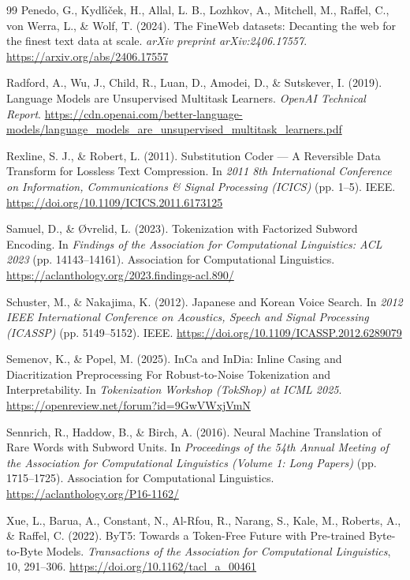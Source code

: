 \documentclass{article}
\begin{document}
\begin{thebibliography}{99}
Penedo, G., Kydl{\'\i}{\v{c}}ek, H., Allal, L. B., Lozhkov, A., Mitchell, M., Raffel, C., von Werra, L., \& Wolf, T. (2024). The FineWeb datasets: Decanting the web for the finest text data at scale. \emph{arXiv preprint arXiv:2406.17557}. \url{https://arxiv.org/abs/2406.17557}

Radford, A., Wu, J., Child, R., Luan, D., Amodei, D., \& Sutskever, I. (2019). Language Models are Unsupervised Multitask Learners. \emph{OpenAI Technical Report}. \url{https://cdn.openai.com/better-language-models/language_models_are_unsupervised_multitask_learners.pdf}

Rexline, S. J., \& Robert, L. (2011). Substitution Coder --- A Reversible
Data Transform for Lossless Text Compression. In \emph{2011 8th
International Conference on Information, Communications \& Signal
Processing (ICICS)} (pp. 1--5). IEEE.
\url{https://doi.org/10.1109/ICICS.2011.6173125}

Samuel, D., \& {\O}vrelid, L. (2023). Tokenization with Factorized Subword
Encoding. In \emph{Findings of the Association for Computational
Linguistics: ACL 2023} (pp. 14143--14161). Association for Computational
Linguistics. \url{https://aclanthology.org/2023.findings-acl.890/}

Schuster, M., \& Nakajima, K. (2012). Japanese and Korean Voice Search. In \emph{2012 IEEE International Conference on Acoustics, Speech and Signal Processing (ICASSP)} (pp. 5149--5152). IEEE. \url{https://doi.org/10.1109/ICASSP.2012.6289079}

Semenov, K., \& Popel, M. (2025). InCa and InDia: Inline Casing and Diacritization Preprocessing For Robust-to-Noise Tokenization and Interpretability. In \emph{Tokenization Workshop (TokShop) at ICML 2025}. \url{https://openreview.net/forum?id=9GwVWxjVmN}

Sennrich, R., Haddow, B., \& Birch, A. (2016). Neural Machine Translation of Rare Words with Subword Units. In \emph{Proceedings of the 54th Annual Meeting of the Association for Computational Linguistics (Volume 1: Long Papers)} (pp. 1715--1725). Association for Computational Linguistics. \url{https://aclanthology.org/P16-1162/}

Xue, L., Barua, A., Constant, N., Al-Rfou, R., Narang, S., Kale, M., Roberts, A., \& Raffel, C. (2022). ByT5: Towards a Token-Free Future with Pre-trained Byte-to-Byte Models. \emph{Transactions of the Association for Computational Linguistics}, 10, 291--306. \url{https://doi.org/10.1162/tacl_a_00461}


\end{thebibliography}
\end{document}
